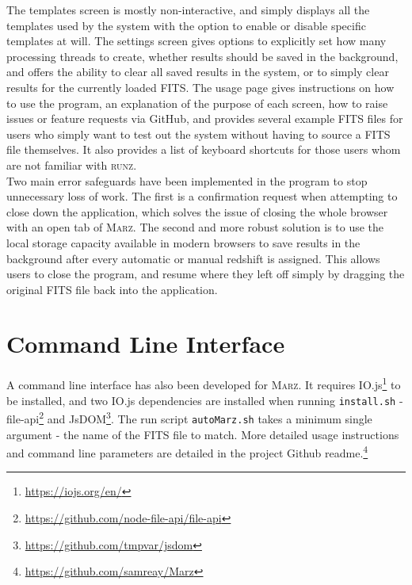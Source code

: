 \documentclass[iop]{emulateapj}
\newcommand{\runz}{\textsc{runz}}
\newcommand{\marz}{\textsc{Marz}}
\begin{document}
The templates screen is mostly non-interactive, and simply displays all the templates used by the system with the option to enable or disable specific templates at will. The settings screen gives options to explicitly set how many processing threads to create, whether results should be saved in the background, and offers the ability to clear all saved results in the system, or to simply clear results for the currently loaded FITS. The usage page gives instructions on how to use the program, an explanation of the purpose of each screen, how to raise issues or feature requests via GitHub, and provides several example FITS files for users who simply want to test out the system without having to source a FITS file themselves. It also provides a list of keyboard shortcuts for those users whom are not familiar with \runz{}.\\

Two main error safeguards have been implemented in the program to stop unnecessary loss of work. The first is a confirmation request when attempting to close down the application, which solves the issue of closing the whole browser with an open tab of \marz{}. The second and more robust solution is to use the local storage capacity available in modern browsers to save results in the background after every automatic or manual redshift is assigned. This allows users to close the program, and resume where they left off simply by dragging the original FITS file back into the application.\\






\section{Command Line Interface}

A command line interface has also been developed for \marz{}. It requires IO.js\footnote{\url{https://iojs.org/en/}} to be installed, and two IO.js dependencies are installed when running \verb;install.sh; - file-api\footnote{\url{https://github.com/node-file-api/file-api}} and JsDOM\footnote{\url{https://github.com/tmpvar/jsdom}}. The run script \verb;autoMarz.sh; takes a minimum single argument - the name of the FITS file to match. More detailed usage instructions and command line parameters are detailed in the project Github readme.\footnote{\url{https://github.com/samreay/Marz}}\\
\end{document}
